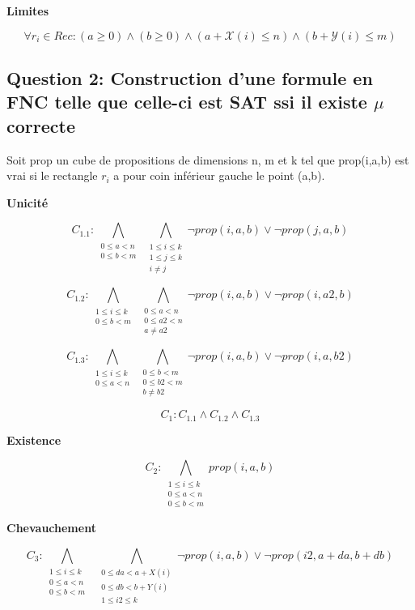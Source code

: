 \documentclass[a4paper,10pt]{article}
\begin{document}
\textbf{Limites}

\begin{equation}
\label{eq:limites}
\forall r_i \in Rec : (a \geq 0) \land (b \geq 0) \land (a+\mathcal{X}(i) \leq n) \land (b + \mathcal{Y}(i) \leq m)
\end{equation}

\newpage

\subsection{Question 2: Construction d'une formule en FNC telle que celle-ci est SAT ssi il existe $\mu$ correcte}

Soit prop un cube de propositions de dimensions n, m et k tel que prop(i,a,b) est vrai si le rectangle $r_i$ a pour coin inférieur gauche le point (a,b).

\textbf{Unicité}

$$C_{1.1} : \bigwedge_{\substack{0 \leq a < n \\ 0 \leq b < m}}\; \bigwedge_{\substack{1 \leq i \leq k \\ 1 \leq j \leq k \\ i \neq j}} \neg prop(i,a,b) \lor \neg prop(j,a,b)$$

$$C_{1.2} : \bigwedge_{\substack{1 \leq i \leq k \\ 0 \leq b < m}}\; \bigwedge_{\substack{0 \leq a < n \\ 0 \leq a2 < n \\ a \neq a2}} \neg prop(i,a,b) \lor \neg prop(i,a2,b)$$

$$C_{1.3} : \bigwedge_{\substack{1 \leq i \leq k \\ 0 \leq a < n}}\; \bigwedge_{\substack{0 \leq b < m \\ 0 \leq b2 < m \\ b \neq b2}} \neg prop(i,a,b) \lor \neg prop(i,a,b2)$$

\begin{center}
$$C_1: C_{1.1} \wedge C_{1.2} \wedge C_{1.3}$$
\end{center}

\textbf{Existence}

$$C_2 : \bigwedge_{\substack{1 \leq i \leq k \\ 0 \leq a < n \\ 0 \leq b < m }} prop(i,a,b) $$

\textbf{Chevauchement}

$$C_3 : \bigwedge_{\substack{1 \leq i \leq k \\ 0 \leq a < n \\ 0 \leq b < m}}\;\; \bigwedge_{\substack{0 \leq da< a + X(i) \\ 0 \leq db < b + Y(i) \\ 1 \leq i2 \leq k}} \neg prop(i,a,b) \lor \neg prop(i2,a+da,b+db)$$
\end{document}
